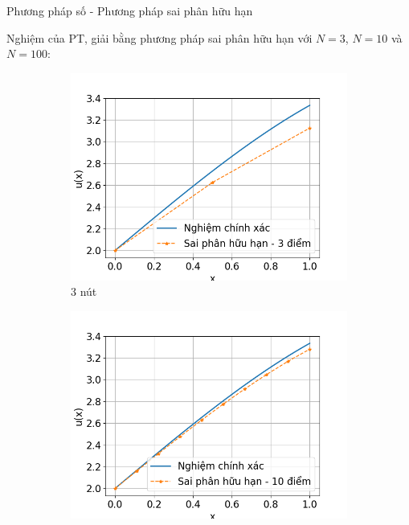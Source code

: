 \documentclass[aspectratio=169, t]{beamer} %
\begin{document}
\begin{frame}{Phương pháp số - Phương pháp sai phân hữu hạn}

\vspace{7mm}
Nghiệm của PT, giải bằng phương pháp sai phân hữu hạn với $N=3$, $N=10$ và $N=100$:
\begin{figure}[htbp]
    \centering
    \begin{subfigure}[b]{0.3\linewidth}
        \centering
        \includegraphics[width=\linewidth]{Slides/Figure/SPHH_3p.png}
        \caption{3 nút}
        \label{fig:SPHH_3p}
    \end{subfigure}\hfill
    \begin{subfigure}[b]{0.3\linewidth}
        \centering
        \includegraphics[width=\linewidth]{Slides/Figure/SPHH_10p.png}

\end{subfigure}
\end{figure}
\end{frame}
\end{document}
